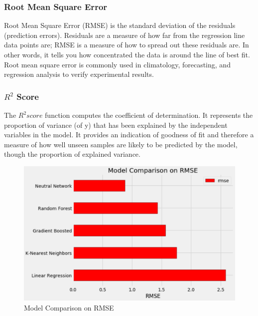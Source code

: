 \documentclass{article}
\begin{document}
\subsubsection*{Root Mean Square Error}
Root Mean Square Error (RMSE) is the standard deviation of the residuals (prediction errors). Residuals are a measure of how far from the regression line data points are; RMSE is a measure of how to spread out these residuals are. In other words, it tells you how concentrated the data is around the line of best fit. Root mean square error is commonly used in climatology, forecasting, and regression analysis to verify experimental results.

\subsubsection*{$R^2$ Score}
The $R^2score$ function computes the coefficient of determination. It represents the proportion of variance (of y) that has been explained by the independent variables in the model. It provides an indication of goodness of fit and therefore a measure of how well unseen samples are likely to be predicted by the model, though the proportion of explained variance.

\begin{figure}[!htb]
	\centering
    \includegraphics[scale=0.35]{rmse.png}
    \caption{Model Comparison on RMSE}\label{fig1}
\end{figure}
\end{document}
